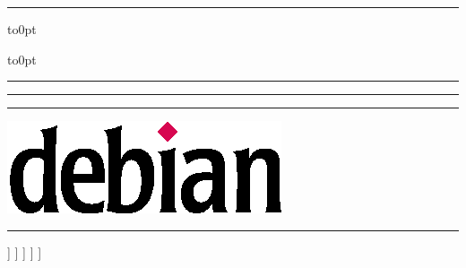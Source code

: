 \begin{minipage}{.98\textwidth}
%
\hspace{-\Separation}%
\smash{\rule[-\textheight]{1pt}{\textheight}}%
\hspace{-1pt}%
\rule{1.04\textwidth}{1pt}%
\hbox to0pt{\vbox to0pt{\rule{1pt}{\textheight}%
\textwidth\rule[-1pt]{1.04\textwidth}{1pt}\rule[-1pt]{0.4pt}{1pt}%
\vss}\hss}%

\vspace*{\Separation}
%
\begin{minipage}{.39\textwidth}

\vspace*{\Separation}

\WhatIsDebian
\end{minipage}
%
\hfill
%
\begin{minipage}{.59\textwidth}
\includegraphics[width=\textwidth]{debian} \\[1ex]
\resizebox*{\textwidth}{!}{\bf \Universal}
\end{minipage}

\vspace*{\Separation}

\hspace{-\Separation}%
\rule{1.04\textwidth}{1pt}

\vspace*{\Separation}

\begin{minipage}[t]{.44\textwidth}
%
\begin{description}\itemsep0cm
\Descriptionsymbol\FreedomCaption] \Freedom
\Descriptionsymbol\CommunityCaption] \Community
\Descriptionsymbol\ContinuityCaption] \Continuity
\Descriptionsymbol\StabilityCaption] \Stability
\Descriptionsymbol\PortabilityCaption] \Portability
\end{description}
%
\end{minipage}
%
\hfill
%
\begin{minipage}[t]{.54\textwidth}
%
\colorbox{debianred}{\textcolor{white}{\bf\Large \IncludedCaption}}


\end{minipage}
\end{minipage}
